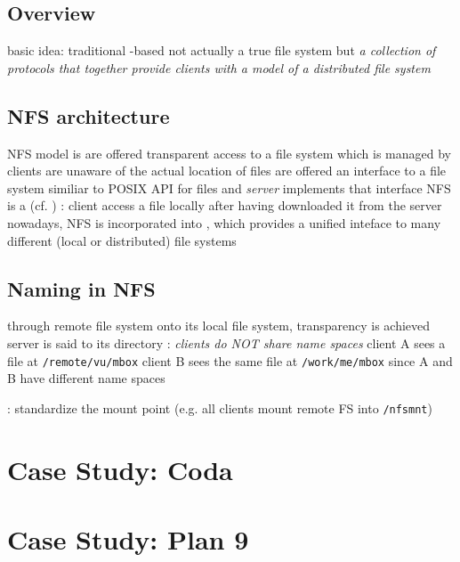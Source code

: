 \documentclass{note}
\begin{document}
\subsection{Overview}
\bit
\w basic idea:  
\w traditional -based
\w not actually a true file system but {\em a collection of protocols that
  together provide clients with a model of a distributed file system\/} 
\eit
\subsection{NFS architecture}
\bit
\w NFS model is 
  \bit
  \w {} are offered transparent access to a file system which is
  managed by 
  \w clients are unaware of the actual location of files
   are offered an interface to a file system similiar to POSIX API
  for files and {\em server\/} implements that interface  
  \eit
\w NFS  is a  (cf. )
  \bit
  \w {}
  \w {}: client access a file locally after having
  downloaded it from the server
  \eit
\w nowadays, NFS is incorporated into , which
provides a unified inteface to many different (local or distributed) file
systems 
\eit

\subsection{Naming in NFS}
\bit
\w through  remote file system onto its local file system,
transparency is achieved
\w server is said to  its directory 
\w {}: {\em clients do NOT share name spaces\/}
   \bit
   \w client A sees a file at \verb+/remote/vu/mbox+
   \w client B sees the same file at \verb+/work/me/mbox+
   \w {} since A and B have different name
   spaces

   \w {}: standardize the mount point (e.g. all clients mount
   remote FS into \verb+/nfsmnt+)
   \eit
\eit

%
%
%
\section{Case Study: Coda}


%
%
%
\section{Case Study: Plan 9}
\end{document}
